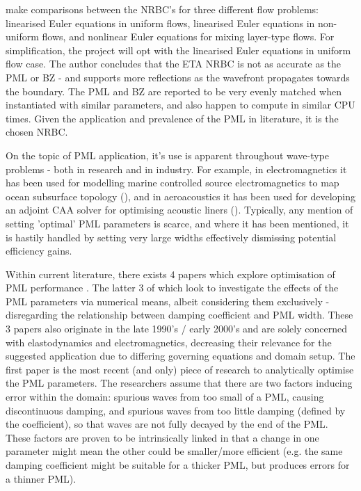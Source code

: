 \textcite{manco2019comparativesnrbc} make comparisons between the NRBC's for three different flow problems: linearised Euler equations in uniform flows, linearised Euler equations in non-uniform flows, and nonlinear Euler equations for mixing layer-type flows. For simplification, the project will opt with the linearised Euler equations in uniform flow case. The author concludes that the ETA NRBC is not as accurate as the PML or BZ - and supports more reflections as the wavefront propagates towards the boundary. The PML and BZ are reported to be very evenly matched when instantiated with similar parameters, and also happen to compute in similar CPU times. Given the application and prevalence of the PML in literature, it is the chosen NRBC.

On the topic of PML application, it's use is apparent throughout wave-type problems - both in research and in industry. For example, in electromagnetics it has been used for modelling marine controlled source electromagnetics to map ocean subsurface topology (\textcite{li2017marineCSEM}), and in aeroacoustics it has been used for developing an adjoint CAA solver for optimising acoustic liners (\textcite{ozkaya2016adjointcaaliner}). Typically, any mention of setting 'optimal' PML parameters is scarce, and where it has been mentioned, it is hastily handled by setting very large widths effectively dismissing potential efficiency gains.


Within current literature, there exists 4 papers which explore optimisation of PML performance \cite{choung2018nonreflective}\cite{li2003optimizationPML}\cite{margengo1999optimumpml}\cite{agrawal2004pmlperformance}. The latter 3 of which look to investigate the effects of the PML parameters via numerical means, albeit considering them exclusively - disregarding the relationship between damping coefficient and PML width. These 3 papers also originate in the late 1990's / early 2000's and are solely concerned with elastodynamics and electromagnetics, decreasing their relevance for the suggested application due to differing governing equations and domain setup. The first paper \cite{choung2018nonreflective} is the most recent (and only) piece of research to analytically optimise the PML parameters. The researchers assume that there are two factors inducing error within the domain: spurious waves from too small of a PML, causing discontinuous damping, and spurious waves from too little damping (defined by the coefficient), so that waves are not fully decayed by the end of the PML. These factors are proven to be intrinsically linked in that a change in one parameter might mean the other could be smaller/more efficient (e.g. the same damping coefficient might be suitable for a thicker PML, but produces errors for a thinner PML). 

